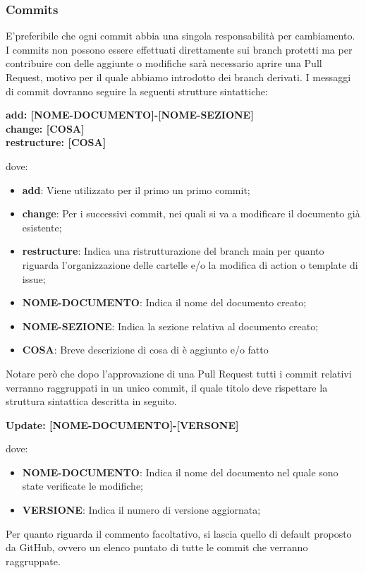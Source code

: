         \subsubsection{Commits}\label{inf:comm}
        E'preferibile che ogni commit abbia una singola responsabilità per cambiamento.
        I commits non possono essere effettuati direttamente sui branch protetti ma per contribuire con delle aggiunte o
        modifiche sarà necessario aprire una Pull Request, motivo per il quale abbiamo introdotto dei branch derivati.
        I messaggi di commit dovranno seguire la seguenti strutture sintattiche:
        \begin{center}
            \textbf{add: [NOME-DOCUMENTO]-[NOME-SEZIONE]\\
            change: [COSA]\\
            restructure: [COSA]}
        \end{center}
        dove: 
        \begin{itemize}
            \item \textbf{add}: Viene utilizzato per il primo un primo commit;
            \item \textbf{change}: Per i successivi commit, nei quali si va a modificare il documento già esistente;
            \item \textbf{restructure}: Indica una ristrutturazione del branch main per quanto riguarda l'organizzazione delle cartelle e/o la modifica di action o template di issue;
            \item \textbf{NOME-DOCUMENTO}: Indica il nome del documento creato;
            \item \textbf{NOME-SEZIONE}: Indica la sezione relativa al documento creato;
            \item \textbf{COSA}: Breve descrizione di cosa di è aggiunto e/o fatto
        \end{itemize}

        Notare però che dopo l'approvazione di una Pull Request tutti i commit
        relativi verranno raggruppati in un unico commit, il quale titolo deve rispettare la struttura sintattica descritta in
        seguito.
        \begin{center}
            \textbf{Update: [NOME-DOCUMENTO]-[VERSONE]}
        \end{center}
        dove:

        \begin{itemize}
            \item \textbf{NOME-DOCUMENTO}: Indica il nome del documento nel quale sono state verificate le modifiche;
            \item \textbf{VERSIONE}: Indica il numero di versione aggiornata;
        \end{itemize}
        Per quanto riguarda il commento facoltativo, si lascia quello di default proposto da GitHub, ovvero un elenco puntato di tutte le commit che verranno raggruppate.\\
        

